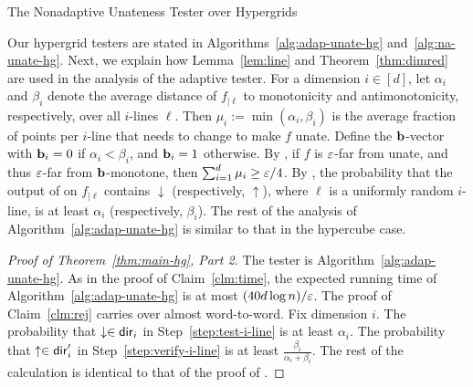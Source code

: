 \begin{algorithm}[h!]
	\caption{The Nonadaptive Unateness Tester over Hypergrids} \label{alg:na-unate-hg}
	\DontPrintSemicolon
	\BlankLine
	
	\nl \label{step:mono}
	\nl \label{step:cube}
\end{algorithm}

Our hypergrid testers are stated in Algorithms~\ref{alg:adap-unate-hg} and~\ref{alg:na-unate-hg}.
Next, we explain how Lemma~\ref{lem:line} and Theorem~\ref{thm:dimred} are used in the analysis of the adaptive tester.
For a dimension $i\in[d]$, let $\alpha_i$ and $\beta_i$ denote the average distance of $f_{|\ell}$ to monotonicity and antimonotonicity, respectively, over all $i$-lines $\ell$.
Then $\mu_i := \min(\alpha_i,\beta_i)$ is the average fraction of points per $i$-line that needs to change to make $f$ unate.
Define the $\mathbf{b}$-vector with $\mathbf{b}_i = 0$ if $\alpha_i < \beta_i$,
and $\mathbf{b}_i = 1$ otherwise.
By ,
if $f$ is $\varepsilon$-far from unate, and thus $\varepsilon$-far from $\mathbf{b}$-monotone, then $\sum_{i=1}^d \mu_i \geq \varepsilon/4$.
By , the probability that the output of  on $f_{|\ell}$
contains $\downarrow$ (respectively, $\uparrow$), where $\ell$ is a uniformly random $i$-line,
is at least $\alpha_i$ (respectively, $\beta_i$).
The rest of the analysis of Algorithm~\ref{alg:adap-unate-hg} is similar to that in the hypercube case.

\begin{proof}[Proof of Theorem~\ref{thm:main-hg}, Part 2]
	The tester is Algorithm~\ref{alg:adap-unate-hg}.
As in the proof of Claim~\ref{clm:time}, the expected running time of Algorithm~\ref{alg:adap-unate-hg} is at most $(40d\log n)/\varepsilon$.
The proof of Claim~\ref{clm:rej} carries over almost word-to-word. Fix dimension $i$. The probability that $\downarrow \in \mathsf{dir}_i$ in Step~\ref{step:test-i-line} is at least $\alpha_i$.
The probability that $\uparrow \in \mathsf{dir}_i'$ in Step~\ref{step:verify-i-line} is at least $\frac{\beta_i}{\alpha_i + \beta_i}$.
The rest of the calculation is identical
to that of the proof of .
\end{proof}

